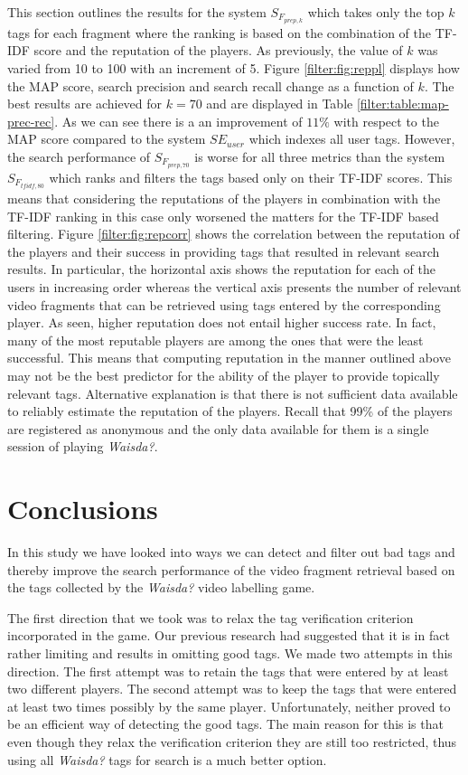 This section outlines the results for the system $S_{F_{prep,k}}$ which takes only the top $k$ tags for each fragment where the ranking is based on the combination of the TF-IDF score and the reputation of the players.
As previously, the value of $k$ was varied from 10 to 100 with an increment of 5. Figure \ref{filter:fig:reppl} displays how the MAP score, search precision and search recall change as a function of $k$. The best results are achieved for $k=70$ and are displayed in Table \ref{filter:table:map-prec-rec}. As we can see there is a an improvement of $11\%$ with respect to the MAP score compared to the system $SE_{user}$ which indexes all user tags. However, the search performance of  $S_{F_{prep,70}}$ is worse for all three metrics than the system $S_{F_{tfidf,80}}$ which ranks and filters the tags based only on their TF-IDF scores. This means that considering the reputations of the players in combination with the TF-IDF ranking in this case only worsened the matters for the TF-IDF based filtering. Figure \ref{filter:fig:repcorr} shows the correlation between the reputation of the players and their success in providing tags that resulted in relevant search results. In particular, the horizontal axis shows the reputation for each of the users in increasing order whereas the vertical axis presents the number of relevant video fragments that can be retrieved using tags entered by the corresponding player. As seen, higher reputation does not entail higher success rate. In fact, many of the most  reputable players are among the ones that were the least successful. This means that computing reputation in the manner outlined above may not be the best predictor for the ability of the player to provide topically relevant tags. Alternative explanation is that there is not sufficient data available to reliably estimate the reputation of the players. Recall that 99\% of the players are registered as anonymous and the only data available for them is a single session of playing \textit{Waisda?}.

\section{Conclusions}\label{filter:sec:con}
In this study we have looked into ways we can detect and filter out bad tags and thereby improve the search performance of the video fragment retrieval based on the tags collected by the \textit{Waisda?} video labelling game.

The first direction that we took was to relax the tag verification criterion incorporated in the game. Our previous research had suggested that it is in fact rather limiting and results in omitting good tags. We made two attempts in this direction. The first attempt was to retain the tags that were entered by at least two different players. The second attempt was to keep the tags that were entered at least two times possibly by the same player. Unfortunately, neither proved to be an efficient way of detecting the good tags. The main reason for this is that even though they relax the verification criterion they are still too restricted, thus using all \textit{Waisda?} tags for search is a much better option.

